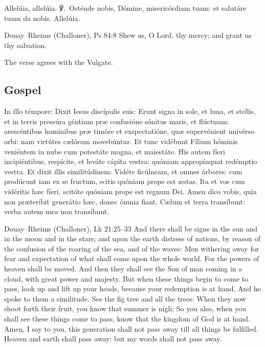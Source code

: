 
\begin{latinproper}
Allelúia, allelúia. ℣.~Osténde nobis, Dómine, misericórdiam tuam: et
salutáre tuum da nobis. Allelúia.
\end{latinproper}

\begin{englishwitness}{Douay--Rheims (Challoner), Ps 84:8}
Shew us, O Lord, thy mercy; and grant us thy salvation.
\end{englishwitness}

\noindent The verse agrees with the Vulgate.

\subsection{Gospel}
\label{proper-gospel}


\begin{latinproper}
In illo témpore: Dixit Iesus discípulis suis: Erunt signa in sole, et luna,
et stellis, et in terris pressúra géntium præ confusióne sónitus maris, et
flúctuum: arescéntibus homínibus præ timóre et exspectatióne, quæ
supervénient univérso orbi: nam virtútes cælórum movebúntur. Et tunc vidébunt
Fílium hóminis veniéntem in nube cum potestáte magna, et maiestáte. His autem
fíeri incipiéntibus, respícite, et leváte cápita vestra: quóniam appropínquat
redémptio vestra. Et dixit illis similitúdinem: Vidéte ficúlneam, et omnes
árbores: cum prodúcunt iam ex se fructum, scitis quóniam prope est æstas. Ita
et vos cum vidéritis hæc fíeri, scitóte quóniam prope est regnum Dei. Amen
dico vobis, quia non præteríbit generátio hæc, donec ómnia fiant. Cælum et
terra transíbunt: verba autem mea non transíbunt.
\end{latinproper}

\begin{englishwitness}{Douay--Rheims (Challoner), Lk 21:25--33}
And there shall be signs in the sun and in the moon and in the stars; and upon
the earth distress of nations, by reason of the confusion of the roaring of
the sea, and of the waves: Men withering away for fear and expectation of
what shall come upon the whole world. For the powers of heaven shall be
moved. And then they shall see the Son of man coming in a cloud, with great
power and majesty. But when these things begin to come to pass, look up and
lift up your heads, because your redemption is at hand. And he spoke to them
a similitude. See the fig tree and all the trees: When they now shoot forth
their fruit, you know that summer is nigh; So you also, when you shall see
these things come to pass, know that the kingdom of God is at hand. Amen, I
say to you, this generation shall not pass away till all things be fulfilled.
Heaven and earth shall pass away: but my words shall not pass away.
\end{englishwitness}

